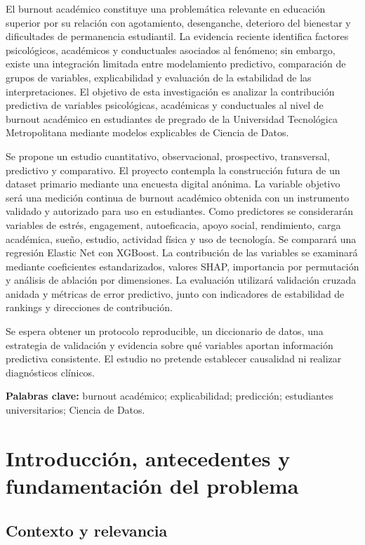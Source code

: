 \documentclass[11pt,a4paper]{article}
\begin{document}
El burnout académico constituye una problemática relevante en educación superior por su relación con agotamiento, desenganche, deterioro del bienestar y dificultades de permanencia estudiantil. La evidencia reciente identifica factores psicológicos, académicos y conductuales asociados al fenómeno; sin embargo, existe una integración limitada entre modelamiento predictivo, comparación de grupos de variables, explicabilidad y evaluación de la estabilidad de las interpretaciones. El objetivo de esta investigación es analizar la contribución predictiva de variables psicológicas, académicas y conductuales al nivel de burnout académico en estudiantes de pregrado de la Universidad Tecnológica Metropolitana mediante modelos explicables de Ciencia de Datos.

Se propone un estudio cuantitativo, observacional, prospectivo, transversal, predictivo y comparativo. El proyecto contempla la construcción futura de un dataset primario mediante una encuesta digital anónima. La variable objetivo será una medición continua de burnout académico obtenida con un instrumento validado y autorizado para uso en estudiantes. Como predictores se considerarán variables de estrés, engagement, autoeficacia, apoyo social, rendimiento, carga académica, sueño, estudio, actividad física y uso de tecnología. Se comparará una regresión Elastic Net con XGBoost. La contribución de las variables se examinará mediante coeficientes estandarizados, valores SHAP, importancia por permutación y análisis de ablación por dimensiones. La evaluación utilizará validación cruzada anidada y métricas de error predictivo, junto con indicadores de estabilidad de rankings y direcciones de contribución.

Se espera obtener un protocolo reproducible, un diccionario de datos, una estrategia de validación y evidencia sobre qué variables aportan información predictiva consistente. El estudio no pretende establecer causalidad ni realizar diagnósticos clínicos.

\textbf{Palabras clave:} burnout académico; explicabilidad; predicción; estudiantes universitarios; Ciencia de Datos.

\section{Introducción, antecedentes y fundamentación del problema}

\subsection{Contexto y relevancia}
\end{document}
